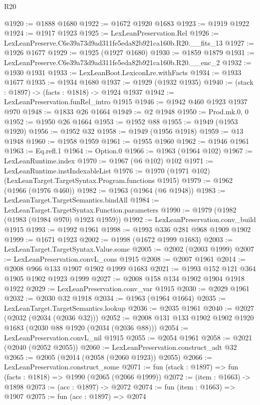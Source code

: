 \begin{lexlean}{R20}
\begin{coremodule}
@1920 := @1888 @1680
@1922 := @1672 @1920 @1683
@1923 := @1919 @1922
@1924 := @1917 @1923
@1925 := LexLeanPreservation.Rel
@1926 := LexLeanPreserve.C6e39a73d9ad311fe5eda82b921ca160b.R20.__fits_13
@1927 := @1926 @1677
@1929 := @1925 (@1927 @1680)
@1930 := @1859 @1879
@1931 := LexLeanPreserve.C6e39a73d9ad311fe5eda82b921ca160b.R20.__enc_2
@1932 := @1930 @1931
@1933 := LexLeanBoot.LexiconLre.withFacts
@1934 := @1933 @1677
@1935 := @1934 @1680
@1937 := @1929 (@1932 @1935)
@1940 := (stack : @1897) -> (facts : @1818) -> @1924 @1937
@1942 := LexLeanPreservation.funRel_intro @1915
@1946 := @1942 @460 @1923 @1937 @970
@1948 := @1833 @26 @1664
@1949 := @2 @1948
@1950 := Prod.mk.{0, 0}
@1952 := @1950 @26 @1664
@1953 := @1952 @88
@1955 := @1949 (@1953 @1920)
@1956 := @1952 @32
@1958 := @1949 (@1956 @1918)
@1959 := @13 @1948
@1960 := @1958 @1959
@1961 := @1955 @1960
@1962 := @1946 @1961
@1963 := Eq.refl.{1}
@1964 := Option.{0}
@1966 := @1963 (@1964 @102)
@1967 := LexLeanRuntime.index
@1970 := @1967 (@6 @102) @102
@1971 := LexLeanRuntime.instIndexableList
@1976 := @1970 (@1971 @102) (LexLeanTarget.TargetSyntax.Program.functions @1915)
@1979 := @1962 (@1966 (@1976 @460))
@1982 := @1963 (@1964 (@6 @1948))
@1983 := LexLeanTarget.TargetSemantics.bindAll
@1984 := LexLeanTarget.TargetSyntax.Function.parameters
@1990 := @1979 (@1982 (@1983 (@1984 @970) @1923 @1959))
@1992 := LexLeanPreservation.conv_build @1915
@1993 := @1992 @1961
@1998 := @1993 @336 @281 @968 @1909 @1902
@1999 := @1671 @1923
@2002 := @1998 (@1672 @1999 @1683)
@2003 := LexLeanTarget.TargetSyntax.Value.some
@2005 := @2002 (@2003 @1999)
@2007 := LexLeanPreservation.convL_cons @1915
@2008 := @2007 @1961
@2014 := @2008 @966 @133 @1907 @1902 @1999 @1683
@2021 := @1993 @152 @121 @364 @1905 @1902 @1923 @1999
@2027 := @2008 @158 @134 @1902 @1904 @1918 @1922
@2029 := LexLeanPreservation.conv_var @1915
@2030 := @2029 @1961
@2032 := @2030 @32 @1918
@2034 := @1963 (@1964 @1664)
@2035 := LexLeanTarget.TargetSemantics.lookup
@2036 := @2035 @1961
@2040 := @2027 (@2032 (@2034 (@2036 @32)))
@2052 := @2008 @131 @133 @1902 @1902 @1920 @1683 (@2030 @88 @1920 (@2034 (@2036 @88)))
@2054 := LexLeanPreservation.convL_nil @1915
@2055 := @2054 @1961
@2058 := @2021 (@2040 (@2052 @2055))
@2060 := LexLeanPreservation.construct_adt @32
@2065 := @2005 (@2014 (@2058 (@2060 @1923)) @2055)
@2066 := LexLeanPreservation.construct_some
@2071 := fun (stack : @1897) => fun (facts : @1818) => @1990 (@2065 (@2066 @1999))
@2072 := (item : @1663) -> @1898
@2073 := (acc : @1897) -> @2072
@2074 := fun (item : @1663) => @1907
@2075 := fun (acc : @1897) => @2074

\end{coremodule}
\end{lexlean}
